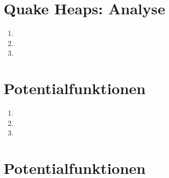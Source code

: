 \documentclass[a4paper,10pt]{article}
\begin{document}
\section{Quake Heaps: Analyse}
\begin{enumerate}
\item   
\item   
\item   
\end{enumerate}

\section{Potentialfunktionen}
\begin{enumerate}
\item   
\item   
\item   
\end{enumerate}

\section{Potentialfunktionen}
\end{document}
